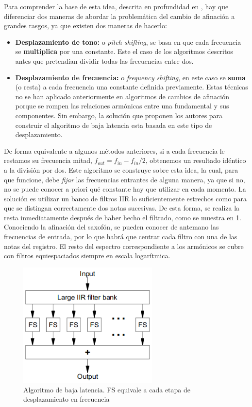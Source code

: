 Para comprender la base de esta idea, descrita en profundidad en \cite{hilbert}, hay que diferenciar dos maneras de abordar la problemática del cambio de afinación a grandes rasgos, ya que existen dos maneras de hacerlo:
\begin{itemize}
\item \textbf{Desplazamiento de tono: }o \emph{pitch shifting}, se basa en que cada frecuencia se \textbf{multiplica} por una constante. Este el caso de los algoritmos descritos antes que pretendían dividir todas las frecuencias entre dos.
\item \textbf{Desplazamiento de frecuencia: }o \emph{frequency shifting}, en este caso se \textbf{suma} (o resta) a cada frecuencia una constante definida previamente. Estas técnicas no se han aplicado anteriormente en algoritmos de cambios de afinación porque se rompen las relaciones armónicas entre una fundamental y sus componentes. Sin embargo, la solución que proponen los autores para construir el algoritmo de baja latencia esta basada en este tipo de desplazamiento.

\end{itemize}
De forma equivalente a algunos métodos anteriores, si a cada frecuencia le restamos su frecuencia mitad, $f_{out} = f_{in}-f_{in}/2$, obtenemos un resultado idéntico a la división por dos. Este algoritmo se construye sobre esta idea, la cual, para que funcione, debe \emph{fijar} las frecuencias entrantes de alguna manera, ya que si no, no se puede conocer a priori qué constante hay que utilizar en cada momento. La solución es utilizar un banco de filtros IIR lo suficientemente estrechos como para que se distingan correctamente dos notas sucesivas. De esta forma, se realiza la resta inmediatamente después de haber hecho el filtrado, como se muestra en \ref{fig:fshil}. Conociendo la afinación del saxofón, se pueden conocer de antemano las frecuencias de entrada, por lo que habrá que centrar cada filtro con una de las notas del registro. El resto del espectro correspondiente a los armónicos se cubre con filtros equiespaciados siempre en escala logarítmica.

\begin{figure} [!h]
\begin{center}
\includegraphics[width=7cm]{img/filtros_hilbert.png}
\caption{\label{fig:fshil}Algoritmo de baja latencia. FS equivale a cada etapa de desplazamiento en frecuencia}
\end{center}
\end{figure}


